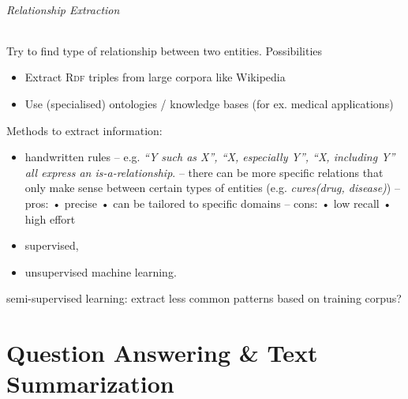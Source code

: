 \documentclass[10pt,twocolumn]{article}
\begin{document}
\paragraph{\textit{Relationship Extraction}} Try to find type of relationship
between two entities. Possibilities
\begin{itemize}
\item Extract \textsc{Rdf} triples from large corpora like Wikipedia
\item Use (specialised) ontologies / knowledge bases (for ex. medical applications)
\end{itemize}
Methods to extract information:
\begin{itemize}
\item handwritten rules -- e.g. \textit{``Y such as X'', ``X, especially Y'',
    ``X, including Y'' all express an \textit{is-a}-relationship}. -- there can
  be more specific relations that only make sense between certain types of
  entities (e.g. \textit{cures(drug, disease)}) -- pros:  • precise  • can be
  tailored to specific domains -- cons:  • low recall  • high effort
\item supervised,
\item unsupervised machine learning.
\end{itemize}

semi-supervised learning: extract less common patterns based on training corpus?






\pagebreak
\part{Question Answering \& Text Summarization}
\end{document}
